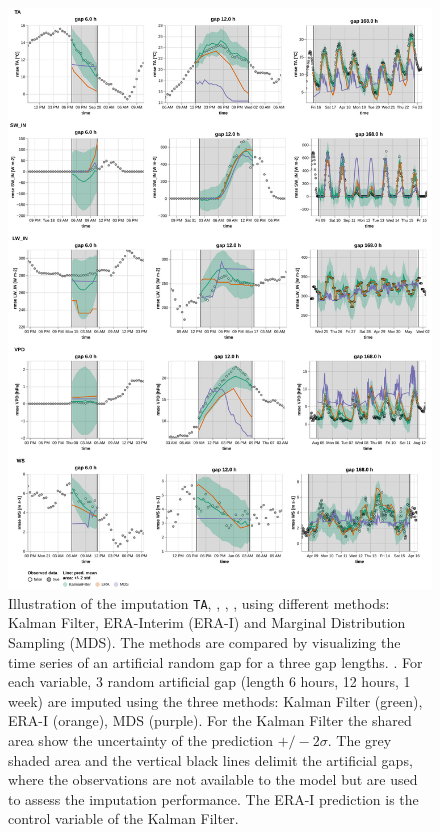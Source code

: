 \documentclass{article}
\newcommand{\imgwidth}{6in}
\begin{document}





\begin{figure}
\centerline{\includegraphics[width=\imgwidth]{images2/timeseries_1}}
\caption{Illustration of the imputation \texttt{TA}, , , ,  using different methods: Kalman Filter, ERA-Interim (ERA-I) and Marginal Distribution Sampling (MDS). The methods are compared by visualizing the time series of an artificial random gap for a three gap lengths. . For each variable, 3 random artificial gap (length 6 hours, 12 hours, 1 week) are imputed using the three methods: Kalman Filter (green), ERA-I (orange), MDS (purple).  For the Kalman Filter the shared area show the uncertainty of the prediction $+/- 2 \sigma$. The grey shaded area and the vertical black lines delimit the artificial gaps, where the observations are not available to the model but are used to assess the imputation performance. The ERA-I prediction is the control variable of the Kalman Filter.}
\label{fig:ts_1-1}
\end{figure}
\restoregeometry
\end{document}
